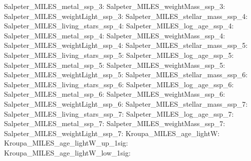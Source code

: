 Salpeter\_MILES\_metal\_ssp\_3:  \newline 
Salpeter\_MILES\_weightMass\_ssp\_3:  \newline 
Salpeter\_MILES\_weightLight\_ssp\_3:  \newline 
Salpeter\_MILES\_stellar\_mass\_ssp\_4:  \newline 
Salpeter\_MILES\_living\_stars\_ssp\_4:  \newline 
Salpeter\_MILES\_log\_age\_ssp\_4:  \newline 
Salpeter\_MILES\_metal\_ssp\_4:  \newline 
Salpeter\_MILES\_weightMass\_ssp\_4:  \newline 
Salpeter\_MILES\_weightLight\_ssp\_4:  \newline 
Salpeter\_MILES\_stellar\_mass\_ssp\_5:  \newline 
Salpeter\_MILES\_living\_stars\_ssp\_5:  \newline 
Salpeter\_MILES\_log\_age\_ssp\_5:  \newline 
Salpeter\_MILES\_metal\_ssp\_5:  \newline 
Salpeter\_MILES\_weightMass\_ssp\_5:  \newline 
Salpeter\_MILES\_weightLight\_ssp\_5:  \newline 
Salpeter\_MILES\_stellar\_mass\_ssp\_6:  \newline 
Salpeter\_MILES\_living\_stars\_ssp\_6:  \newline 
Salpeter\_MILES\_log\_age\_ssp\_6:  \newline 
Salpeter\_MILES\_metal\_ssp\_6:  \newline 
Salpeter\_MILES\_weightMass\_ssp\_6:  \newline 
Salpeter\_MILES\_weightLight\_ssp\_6:  \newline 
Salpeter\_MILES\_stellar\_mass\_ssp\_7:  \newline 
Salpeter\_MILES\_living\_stars\_ssp\_7:  \newline 
Salpeter\_MILES\_log\_age\_ssp\_7:  \newline 
Salpeter\_MILES\_metal\_ssp\_7:  \newline 
Salpeter\_MILES\_weightMass\_ssp\_7:  \newline 
Salpeter\_MILES\_weightLight\_ssp\_7:  \newline 
Kroupa\_MILES\_age\_lightW:  \newline 
Kroupa\_MILES\_age\_lightW\_up\_1sig:  \newline 
Kroupa\_MILES\_age\_lightW\_low\_1sig:  \newline 
